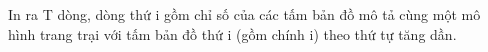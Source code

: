 In ra T dòng, dòng thứ i gồm chỉ số của các tấm bản đồ mô tả cùng một mô hình trang trại với tấm bản đồ thứ i (gồm chính i) theo thứ tự tăng dần.  

\